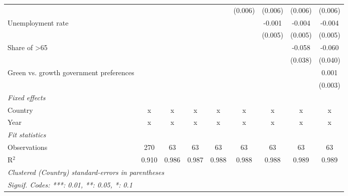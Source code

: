 \begin{table}[htbp]
\begin{tabular}{lcccccccc}
                                                                &         &         &         &               & (0.006)       & (0.006)       & (0.006)       & (0.006)\\   
      Unemployment rate                                         &         &         &         &               &               & -0.001        & -0.004        & -0.004\\   
                                                                &         &         &         &               &               & (0.005)       & (0.005)       & (0.005)\\   
      Share of >65                                              &         &         &         &               &               &               & -0.058        & -0.060\\   
                                                                &         &         &         &               &               &               & (0.038)       & (0.040)\\   
      Green vs. growth government preferences                   &         &         &         &               &               &               &               & 0.001\\   
                                                                &         &         &         &               &               &               &               & (0.003)\\   
      \emph{Fixed effects}\\
      Country                                                   & x       & x       & x       & x             & x             & x             & x             & x\\  
      Year                                                      & x       & x       & x       & x             & x             & x             & x             & x\\  
      \midrule \emph{Fit statistics}\\
      Observations                                              & 270     & 63      & 63      & 63            & 63            & 63            & 63            & 63\\  
      R$^2$                                                     & 0.910   & 0.986   & 0.987   & 0.988         & 0.988         & 0.988         & 0.989         & 0.989\\  
      \midrule
      \multicolumn{9}{l}{\emph{Clustered (Country) standard-errors in parentheses}}\\
      \multicolumn{9}{l}{\emph{Signif. Codes: ***: 0.01, **: 0.05, *: 0.1}}\\
   \end{tabular}
\end{table}


